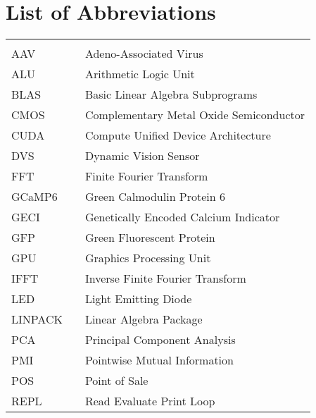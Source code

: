 \chapter*{List of Abbreviations}\label{list-of-abbreviations}

\begin{center}
    \begin{tabular}{lll}
        \hspace*{2em}    & \hspace*{0.5in} & \hspace*{\fill}  \\
      AAV               & \dotfill      & Adeno-Associated Virus  \\
      ALU               & \dotfill      & Arithmetic Logic Unit \\
      BLAS               & \dotfill      & Basic Linear Algebra Subprograms \\
      CMOS               & \dotfill      & Complementary Metal Oxide Semiconductor  \\
      CUDA               & \dotfill      & Compute Unified Device Architecture \\
      DVS               & \dotfill      & Dynamic Vision Sensor \\
      FFT               & \dotfill      & Finite Fourier Transform  \\
      GCaMP6               & \dotfill      & Green Calmodulin Protein 6 \\
      GECI               & \dotfill      & Genetically Encoded Calcium Indicator  \\
      GFP               & \dotfill      & Green Fluorescent Protein \\
      GPU               & \dotfill      & Graphics Processing Unit  \\
      IFFT               & \dotfill      & Inverse Finite Fourier Transform \\
      LED               & \dotfill      & Light Emitting Diode  \\
      LINPACK               & \dotfill      & Linear Algebra Package  \\
      PCA               & \dotfill      & Principal Component Analysis  \\
      PMI               & \dotfill      & Pointwise Mutual Information  \\
      POS               & \dotfill      & Point of Sale \\
      REPL               & \dotfill      & Read Evaluate Print Loop \\

\end{tabular}
\end{center}
